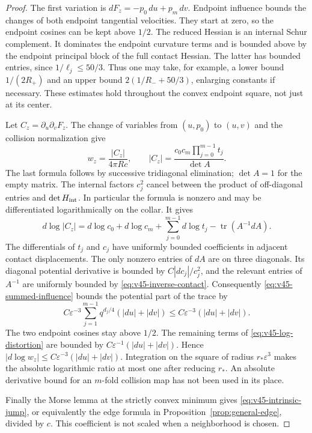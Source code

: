 \begin{proof}
The first variation is $dF_z=-p_0\,du+p_m\,dv$.
Endpoint influence bounds the changes of both endpoint tangential
velocities. They start at zero, so the endpoint cosines can be kept
above $1/2$. The reduced Hessian is an internal Schur complement.
It dominates the endpoint curvature terms and is bounded above by
the endpoint principal block of the full contact Hessian. The latter
has bounded entries, since $1/\ell_j\le50/3$. Thus one may take,
for example, a lower bound $1/(2R_+)$ and an upper bound
$2(1/R_-+50/3)$, enlarging constants if necessary. These estimates
hold throughout the convex endpoint square, not just at its center.

Let $C_z=\partial_u\partial_vF_z$. The change of variables from
$(u,p_0)$ to $(u,v)$ and the collision normalization give
\begin{equation}\label{eq:v45-cross-density}
 w_z=\frac{|C_z|}{4\pi R c},\qquad
 |C_z|=\frac{c_0c_m\prod_{j=0}^{m-1}t_j}{\det A}.
\end{equation}
The last formula follows by successive tridiagonal elimination;
$\det A=1$ for the empty matrix. The internal factors $c_j^2$ cancel
between the product of off-diagonal entries and $\det H_{\rm int}$.
In particular the formula is nonzero and may be differentiated
logarithmically on the collar. It gives
\begin{equation}\label{eq:v45-log-distortion}
 d\log|C_z|=d\log c_0+d\log c_m+
            \sum_{j=0}^{m-1}d\log t_j-\operatorname{tr}(A^{-1}dA).
\end{equation}
The differentials of $t_j$ and $c_j$ have uniformly bounded
coefficients in adjacent contact displacements. The only nonzero entries
of $dA$ are on three diagonals. Its diagonal potential derivative is
bounded by $C|dc_j|/c_j^2$, and the relevant entries of $A^{-1}$
are uniformly bounded by \eqref{eq:v45-inverse-contact}. Consequently
\eqref{eq:v45-summed-influence} bounds the potential part of the trace by
\[
 C\varepsilon^{-3}\sum_{j=1}^{m-1}q^{d_j/4}(|du|+|dv|)
       \le C\varepsilon^{-3}(|du|+|dv|).
\]
The two endpoint cosines stay above $1/2$. The remaining terms of
\eqref{eq:v45-log-distortion} are bounded by
$C\varepsilon^{-1}(|du|+|dv|)$. Hence
$|d\log w_z|\le C\varepsilon^{-3}(|du|+|dv|)$.
Integration on the square of radius $r_*\varepsilon^3$ makes the
absolute logarithmic ratio at most one after reducing $r_*$.
An absolute derivative bound for an
$m$-fold collision map has not been used in its place.

Finally the Morse lemma at the strictly convex minimum gives
\eqref{eq:v45-intrinsic-jump}, or equivalently the edge formula in
Proposition~\ref{prop:general-edge}, divided by $c$. This coefficient
is not scaled when a neighborhood is chosen.
\end{proof}


